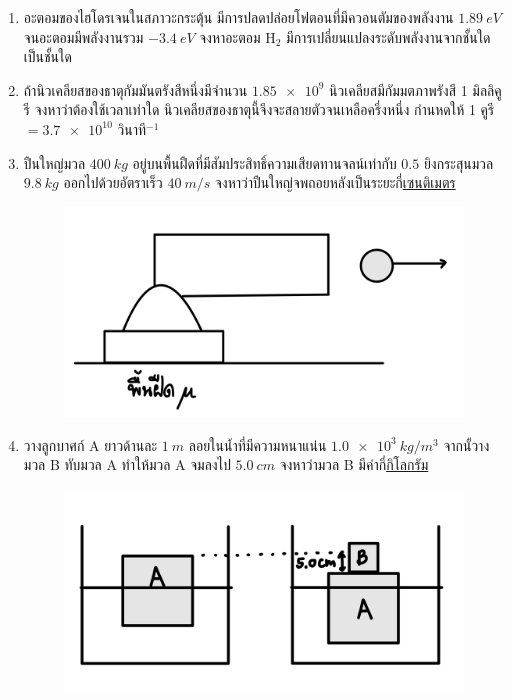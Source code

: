\documentclass[a4paper,12pt]{article}
\begin{document}
\begin{enumerate}
		\item อะตอมของไฮโดรเจนในสภาวะกระตุ้น มีการปลดปล่อยโฟตอนที่มีควอนตัมของพลังงาน \(\SI{1.89}{eV}\) จนอะตอมมีพลังงานรวม \(\SI{-3.4}{eV}\) จงหาอะตอม \(\text{H}_2\) มีการเปลี่ยนแปลงระดับพลังงานจากชั้นใดเป็นชั้นใด
			\vspace{4cm}
		
		\item ถ้านิวเคลียสของธาตุกัมมันตรังสีหนึ่งมีจำนวน \(\num{1.85e9}\) นิวเคลียสมีกัมมตภาพรังสี 1 มิลลิคูรี จงหาว่าต้องใช้เวลาเท่าใด นิวเคลียสของธาตุนี้จึงจะสลายตัวจนเหลือครึ่งหนึ่ง
		กำนหดให้ 1 คูรี \(=\num{3.7e10}\) วินาที\(^{-1}\)
			\vspace{4cm}
		
		\item ปืนใหญ่มวล \(\SI{400}{kg}\) อยู่บนพื้นฝืดที่มีสัมประสิทธิ์ความเสียดทานจลน์เท่ากับ \(0.5\) ยิงกระสุนมวล \(\SI{9.8}{kg}\) ออกไปด้วยอัตราเร็ว \(\SI{40}{m/s}\) จงหาว่าปืนใหญ่จพถอยหลังเป็นระยะกี่\underline{เซนติเมตร}\\
		\begin{figure}[h]
			\centering
			\includegraphics[width=0.5\linewidth]{26}
		\end{figure}
			\vspace{4cm}
		
		\item วางลูกบาศก์ A ยาวด้านละ \(\SI{1}{m}\) ลอยในน้ำที่มีความหนาแน่น \(\SI{1.0e3}{kg/m^3}\) จากนั้วางมวล B ทับมวล A ทำให้มวล A จมลงไป \(\SI{5.0}{cm}\) จงหาว่ามวล B มีค่ากี่\underline{กิโลกรัม}
		\begin{figure}[h]
			\centering
			\includegraphics[width=0.5\linewidth]{27}
		\end{figure}
			\vspace{4cm}
		

\end{enumerate}
\end{document}
